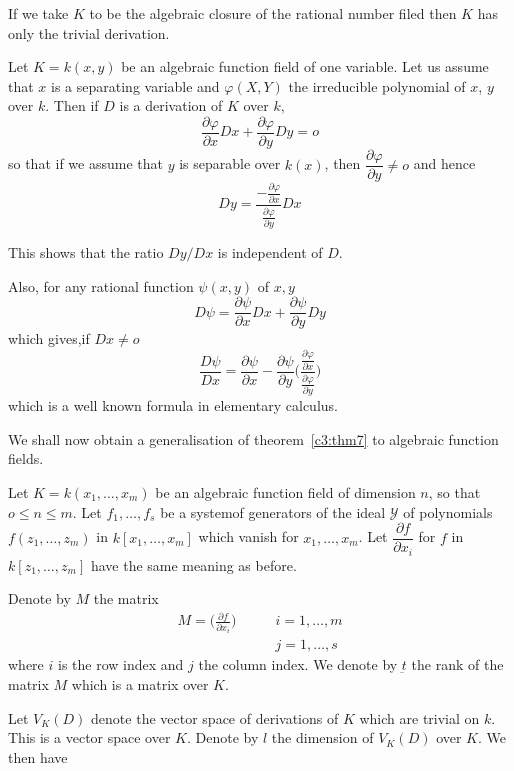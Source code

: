 If we take $K$ to be the algebraic closure of the rational number
filed then $K$ has only the trivial derivation. 

Let $K=k(x,y)$ be an algebraic function field of one variable. Let us
assume that $x$ is a separating variable and  $\varphi(X,Y)$ the
irreducible polynomial of $x$, $y$ over $k$. Then if $D$ is a derivation
of $K$ over $k$, 
$$
\frac{\partial \varphi}{\partial x} Dx + \frac{\partial
  \varphi}{\partial y} Dy = o 
$$
so that if we assume that $y$ is separable over $k(x)$, then
$\dfrac{\partial \varphi}{\partial y} \neq o$ and hence  
$$
Dy=\frac{-{\frac{\partial \varphi}{\partial x}}}{\frac{\partial
    \varphi}{\partial y}} Dx 
$$

This shows that the ratio $Dy/Dx$ is independent of $D$.

Also, for any rational function $\psi(x,y)$ of $x,y$
$$
D \psi = \frac{\partial \psi}{\partial x} Dx + \frac{\partial
  \psi}{\partial y} Dy 
$$
which gives,if $Dx \neq o$
$$
\frac{D \psi}{D x}= \frac{\partial \psi}{\partial x}-\frac{\partial
  \psi}{\partial y} \Bigg(\frac{{\frac{\partial \varphi}{\partial
      x}}}{\frac{\partial \varphi}{\partial y}} \Bigg) 
$$
which is a well known formula in elementary calculus.

We shall now obtain a generalisation of theorem~\ref{c3:thm7} to algebraic
function fields. 

Let $K= k(x_1, \ldots, x_m)$ be an algebraic function field of
dimension $n$, so that $o \leq n \leq m$. Let $f_1, \ldots, f_s$ be a
system\pageoriginale of generators of the ideal $\mathscr{Y}$ of
polynomials $f(z_1, 
\ldots, z_m)$ in $k [x_1, \ldots, x_m]$ which vanish for $x_1, \ldots,
x_m$. Let $\dfrac{\partial
  f}{\partial x_i}$ for $f$ in $k [z_1, \ldots, z_m]$ have the same
meaning as before. 

Denote by $M$ the matrix
\begin{align*}
M = \Bigg(\frac{\partial f}{\partial x_i} \Bigg)  \qquad &i = 1,
\ldots ,m\\ 
\qquad &j=1, \ldots,s
\end{align*}
where $i$ is the row index and $j$ the column index. We denote by
$\underbar{t}$ the rank of the matrix $M$ which is a matrix over $K$. 

Let $V_K(D)$ denote the vector space of derivations of $K$ which are
trivial on $k$. This is a vector space over $K$. Denote by $l$ the
dimension of  $V_K(D)$ over $K$. We then have  

\begin{thm}\label{c3:thm8}%
\end{thm}

